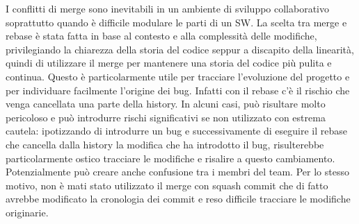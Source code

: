 I conflitti di merge sono inevitabili in un ambiente di sviluppo collaborativo soprattutto quando è difficile modulare le parti di un SW.
La scelta tra merge e rebase è stata fatta in base al contesto e alla complessità delle modifiche, privilegiando la chiarezza della storia del codice seppur a discapito della linearità, 
quindi di utilizzare il merge per mantenere una storia del codice più pulita e continua.
Questo è particolarmente utile per tracciare
l’evoluzione del progetto e per individuare facilmente l’origine dei bug. 
Infatti con il rebase c'è il rischio che venga cancellata una parte della history. In alcuni casi, può risultare molto pericoloso e 
può introdurre rischi significativi se non utilizzato con estrema cautela:
ipotizzando di introdurre un bug e successivamente di eseguire il rebase che cancella dalla history la modifica che ha introdotto il bug,
risulterebbe particolarmente ostico tracciare le modifiche e risalire a questo cambiamento. Potenzialmente può creare anche confusione tra i membri del team.
Per lo stesso motivo, non è mati stato utilizzato il merge con squash commit che di fatto avrebbe modificato la cronologia dei commit e reso difficile tracciare le modifiche originarie.





